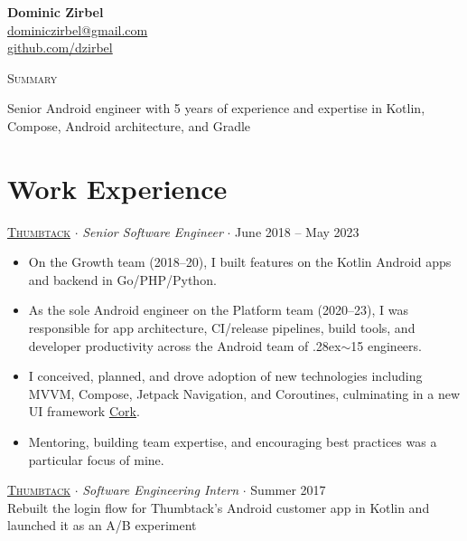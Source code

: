 \documentclass[letterpaper,10pt]{article}
\newcommand{\nicetilde}{\raise.28ex\hbox{$\scriptstyle\sim$}}
\newenvironment{lcol}
{
    \begin{minipage}[t]{.18\linewidth}
    \begin{flushright}
}
{
    \end{flushright}
    \end{minipage}
}
\newenvironment{rcol}
{
    \hspace{.005\linewidth}
    \begin{minipage}[t]{.8\linewidth}
}
{
    \end{minipage}
}
\begin{document}
\thispagestyle{empty}

\begin{flushright}
    \textbf{\Large{Dominic Zirbel}} \\
    \href{mailto:dominiczirbel@gmail.com}{dominiczirbel@gmail.com} \\
    \href{https://github.com/dzirbel}{ github.com/dzirbel}
\end{flushright}

\begin{lcol}
    {\large{\textsc{Summary}}}
\end{lcol}
\begin{rcol}
    Senior Android engineer with 5 years of experience and expertise in Kotlin, Compose, Android architecture, and Gradle
\end{rcol}

\section{Work Experience}

\href{https://www.thumbtack.com/about}{\textsc{Thumbtack}} $\cdot$ \textit{Senior Software Engineer} $\cdot$ June 2018 -- May 2023
\begin{itemize}[itemsep=2pt, parsep=0pt, partopsep=0pt]
  \item On the Growth team (2018--20), I built features on the Kotlin Android apps and backend in Go/PHP/Python.
  \item As the sole Android engineer on the Platform team (2020--23), I was responsible for app architecture, CI/release pipelines, build tools, and developer productivity across the Android team of \nicetilde15 engineers.
  \item I conceived, planned, and drove adoption of new technologies including MVVM, Compose, Jetpack Navigation, and Coroutines, culminating in a new UI framework \href{https://medium.com/thumbtack-engineering/61a24e5e82b6}{\underline{Cork}}.
  \item Mentoring, building team expertise, and encouraging best practices was a particular focus of mine.
\end{itemize}

\vspace{6pt}

\href{https://www.thumbtack.com/about}{\textsc{Thumbtack}} $\cdot$ \textit{Software Engineering Intern} $\cdot$ Summer 2017 \\
\-\hspace{.28in} Rebuilt the login flow for Thumbtack's Android customer app in Kotlin and launched it as an A/B experiment
\end{document}
